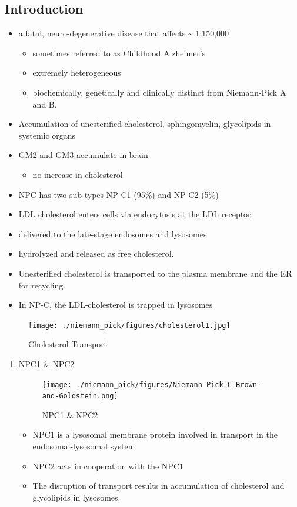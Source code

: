 \documentclass{scrartcl}
\begin{document}
\subsection{Introduction}
\label{sec:org53f5ca6}
\begin{itemize}
\item a fatal, neuro-degenerative disease that affects \textasciitilde{} 1:150,000
\begin{itemize}
\item sometimes referred to as Childhood Alzheimer’s
\item extremely heterogeneous
\item biochemically, genetically and clinically distinct from Niemann-Pick A and B.
\end{itemize}
\item Accumulation of unesterified cholesterol, sphingomyelin, glycolipids in systemic organs
\item GM2 and GM3 accumulate in brain
\begin{itemize}
\item no increase in cholesterol
\end{itemize}
\item NPC has two sub types NP-C1 (95\%) and NP-C2 (5\%)

\item LDL cholesterol enters cells via endocytosis at the LDL receptor.
\item delivered to the late-stage endosomes and lysosomes
\item hydrolyzed and released as free cholesterol.
\item Unesterified cholesterol is transported to the plasma membrane and the ER for recycling.

\item In NP-C, the LDL-cholesterol is trapped in lysosomes
\end{itemize}

\begin{figure}[htbp]
\centering
\texttt{[image: ./niemann\_pick/figures/cholesterol1.jpg]}
\caption{\label{fig:org5011f2c}
Cholesterol Transport}
\end{figure}

\begin{enumerate}
\item NPC1 \& NPC2
\label{sec:org8fe05f6}

\begin{figure}[htbp]
\centering
\texttt{[image: ./niemann\_pick/figures/Niemann-Pick-C-Brown-and-Goldstein.png]}
\caption{\label{fig:org6c53951}
NPC1 \& NPC2}
\end{figure}

\begin{itemize}
\item NPC1 is a lysosomal membrane protein involved in transport in the endosomal-lysosomal system
\item NPC2 acts in cooperation with the NPC1
\item The disruption of transport results in accumulation of cholesterol and glycolipids in lysosomes.
\end{itemize}
\end{enumerate}
\end{document}
